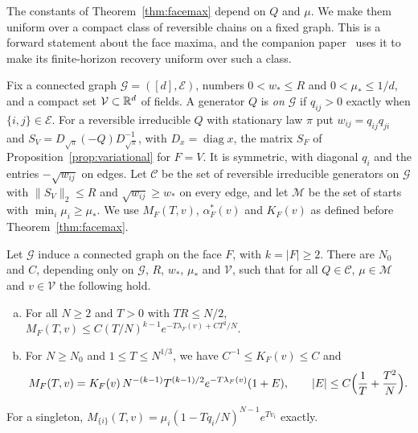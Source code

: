 The constants of Theorem~\ref{thm:facemax} depend on $Q$ and $\mu$. We make them
uniform over a compact class of reversible chains on a fixed graph. This is a forward
statement about the face maxima, and the companion paper~\cite{paperC2} uses it to make its
finite-horizon recovery uniform over such a class.

Fix a connected graph $\mathcal G=([d],\mathcal E)$, numbers $0<w_*\le R$ and
$0<\mu_*\le1/d$, and a compact set $\mathcal V\subset\mathbb{R}^d$ of fields. A generator $Q$ is
\emph{on $\mathcal G$} if $q_{ij}>0$ exactly when $\{i,j\}\in\mathcal E$. For a reversible
irreducible $Q$ with stationary law $\pi$ put $w_{ij}=q_{ij}q_{ji}$ and
$S_V=D_{\sqrt\pi}(-Q)D_{\sqrt\pi}^{-1}$, with $D_x=\operatorname{diag}x$, the matrix $S_F$ of
Proposition~\ref{prop:variational} for $F=V$. It is symmetric, with diagonal $q_i$ and
the entries $-\sqrt{w_{ij}}$ on edges. Let $\mathcal C$ be the set of reversible
irreducible generators on $\mathcal G$ with $\|S_V\|_2\le R$ and $\sqrt{w_{ij}}\ge w_*$ on
every edge, and let $\mathcal M$ be the set of starts with $\min_i\mu_i\ge\mu_*$. We use
$M_F(T,v)$, $\alpha^*_F(v)$ and $K_F(v)$ as defined before Theorem~\ref{thm:facemax}.

\begin{proposition}\label{prop:uniform-facemax}
Let $\mathcal G$ induce a connected graph on the face $F$, with $k=|F|\ge2$. There are
$N_0$ and $C$, depending only on $\mathcal G$, $R$, $w_*$, $\mu_*$ and $\mathcal V$, such that for all
$Q\in\mathcal C$, $\mu\in\mathcal M$ and $v\in\mathcal V$ the following hold.
\begin{enumerate}[(a)]
\item For all $N\ge2$ and $T>0$ with $TR\le N/2$,
$M_F(T,v)\le C(T/N)^{k-1}e^{-T\lambda_F(v)+CT^2/N}$.
\item For $N\ge N_0$ and $1\le T\le N^{1/3}$, we have $C^{-1}\le K_F(v)\le C$ and
\[
 M_F(T,v)=K_F(v)\,N^{-(k-1)}T^{(k-1)/2}e^{-T\lambda_F(v)}(1+E),\qquad
 |E|\le C\Bigl(\frac1T+\frac{T^2}N\Bigr).
\]
\end{enumerate}
For a singleton, $M_{\{i\}}(T,v)=\mu_i(1-Tq_i/N)^{N-1}e^{Tv_i}$ exactly.
\end{proposition}

